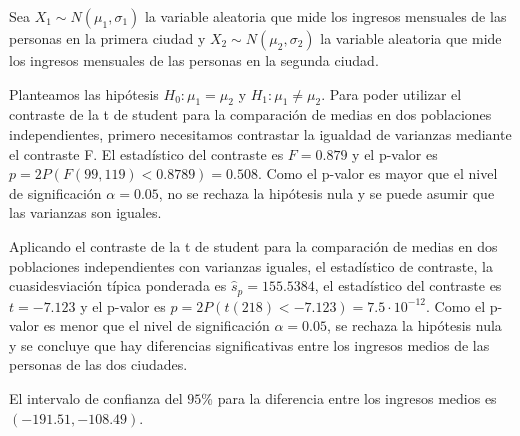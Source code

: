 \documentclass[
  spanish,
  a4paper,
]{scrreport}
\theoremstyle{definition}
\theoremstyle{remark}
\begin{document}
\begin{tcolorbox}[enhanced jigsaw, arc=.35mm, bottomrule=.15mm, bottomtitle=1mm, breakable, colback=white, colbacktitle=quarto-callout-tip-color!10!white, colframe=quarto-callout-tip-color-frame, coltitle=black, left=2mm, leftrule=.75mm, opacityback=0, opacitybacktitle=0.6, rightrule=.15mm, title=\textcolor{quarto-callout-tip-color}{\faLightbulb}\hspace{0.5em}{Solución}, titlerule=0mm, toprule=.15mm, toptitle=1mm]

Sea \(X_1\sim N(\mu_1, \sigma_1)\) la variable aleatoria que mide los
ingresos mensuales de las personas en la primera ciudad y
\(X_2\sim N(\mu_2, \sigma_2)\) la variable aleatoria que mide los
ingresos mensuales de las personas en la segunda ciudad.

Planteamos las hipótesis \(H_0: \mu_1=\mu_2\) y
\(H_1: \mu_1\neq \mu_2\). Para poder utilizar el contraste de la t de
student para la comparación de medias en dos poblaciones independientes,
primero necesitamos contrastar la igualdad de varianzas mediante el
contraste F. El estadístico del contraste es \(F=0.879\) y el p-valor es
\(p =2 P(F(99,119)<0.8789) = 0.508\). Como el p-valor es mayor que el
nivel de significación \(\alpha = 0.05\), no se rechaza la hipótesis
nula y se puede asumir que las varianzas son iguales.

Aplicando el contraste de la t de student para la comparación de medias
en dos poblaciones independientes con varianzas iguales, el estadístico
de contraste, la cuasidesviación típica ponderada es
\(\hat s_p = 155.5384\), el estadístico del contraste es \(t= -7.123\) y
el p-valor es \(p =2 P(t(218)<-7.123) = 7.5\cdot 10^{-12}\). Como el
p-valor es menor que el nivel de significación \(\alpha = 0.05\), se
rechaza la hipótesis nula y se concluye que hay diferencias
significativas entre los ingresos medios de las personas de las dos
ciudades.

El intervalo de confianza del \(95\)\% para la diferencia entre los
ingresos medios es \((-191.51, -108.49)\).

\end{tcolorbox}
\end{document}
